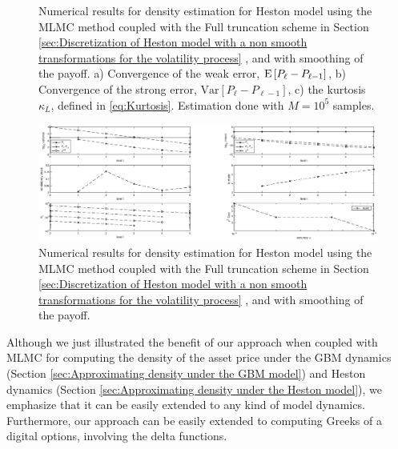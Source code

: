 \begin{figure}[htb]
\begin{subfigure}{0.5\textwidth}
		\caption{}
		\label{fig:hest_density_kurt_FT}
	\end{subfigure}
	\caption{Numerical results for  density estimation  for Heston model  using the MLMC method coupled with   the Full truncation scheme in Section \ref{sec:Discretization of Heston model with a non smooth transformations for the volatility process} , and with smoothing of the payoff. a) Convergence of  the weak error, $\mathrm{E}\left[P_{\ell}-P_{\ell-1}\right]$, b) Convergence of  the strong error, $\text{Var}\left[P_{\ell}-P_{\ell-1}\right]$, c) the kurtosis $\kappa_{L}$, defined in \eqref{eq:Kurtosis}.  Estimation done with $M=10^5$ samples.}
	\label{fig:outputs_heston_density_FT}	
\end{figure}
\FloatBarrier
	\begin{figure}[h!]
\centering
\includegraphics[width=1.2\linewidth]{./figures/MLMC_density_Heston_estimation/FT/digital_option_set1_L_0_8_steps_L_5.eps}

\caption{Numerical results for  density estimation  for Heston model  using the MLMC method coupled with   the Full truncation scheme in Section \ref{sec:Discretization of Heston model with a non smooth transformations for the volatility process} , and with smoothing of the payoff.}
\label{fig:Heston_density_MLMC_with_smoothing_FT}
\end{figure}
\FloatBarrier


\begin{remark}
Although we just illustrated the benefit of our approach when coupled with MLMC for computing the density  of the asset price under the GBM dynamics (Section \ref{sec:Approximating density under the GBM model}) and Heston dynamics (Section \ref{sec:Approximating density under the Heston model}), we emphasize that it can be easily extended to any kind of model dynamics. Furthermore, our approach can be easily extended to computing Greeks of a digital options, involving the delta functions.
\end{remark}
